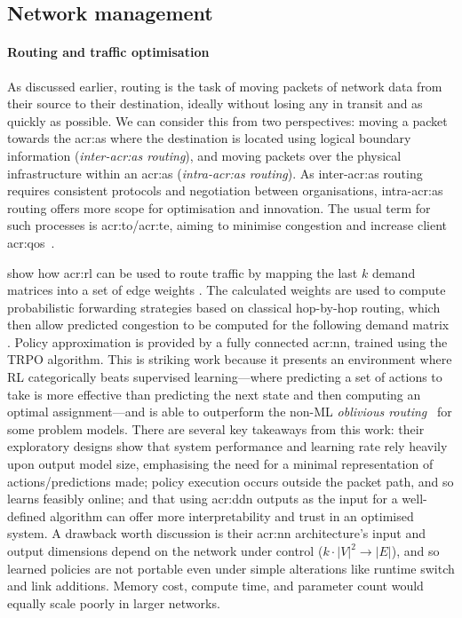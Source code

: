\subsection{Network management}

\paragraph{Routing and traffic optimisation}
As discussed earlier, routing is the task of moving packets of network data from their source to their destination, ideally without losing any in transit and as quickly as possible.
We can consider this from two perspectives: moving a packet towards the \gls{acr:as} where the destination is located using logical boundary information (\emph{inter-\gls{acr:as} routing}), and moving packets over the physical infrastructure within an \gls{acr:as} (\emph{intra-\gls{acr:as} routing}).
As inter-\gls{acr:as} routing requires consistent protocols and negotiation between organisations, intra-\gls{acr:as} routing offers more scope for optimisation and innovation.
The usual term for such processes is \gls{acr:to}/\gls{acr:te}, aiming to minimise congestion and increase client \gls{acr:qos}~\parencite{rfc3272}.

\textcite{DBLP:conf/hotnets/ValadarskySST17} show how \gls{acr:rl} can be used to route traffic by mapping the last $k$ demand matrices \prllitstate{} into a set of edge weights \prllitactreal.
The calculated weights are used to compute probabilistic forwarding strategies based on classical hop-by-hop routing, which then allow predicted congestion to be computed for the following demand matrix \prllitreward.
Policy approximation is provided by a fully connected \gls{acr:nn}, trained using the TRPO algorithm.
This is striking work because it presents an environment where RL categorically beats supervised learning---where predicting a set of actions to take is more effective than predicting the next state and then computing an optimal assignment---and is able to outperform the non-ML \emph{oblivious routing}~\parencite{DBLP:conf/stoc/AzarCFKR03} for some problem models.
There are several key takeaways from this work: their exploratory designs show that system performance and learning rate rely heavily upon output model size, emphasising the need for a minimal representation of actions/predictions made; policy execution occurs outside the packet path, and so learns feasibly online; and that using \gls{acr:ddn} outputs as the input for a well-defined algorithm can offer more interpretability and trust in an optimised system.
A drawback worth discussion is their \gls{acr:nn} architecture's input and output dimensions depend on the network under control ($k\cdot\left|V\right|^2\rightarrow\left|E\right|$), and so learned policies are not portable even under simple alterations like runtime switch and link additions.
Memory cost, compute time, and parameter count would equally scale poorly in larger networks.

